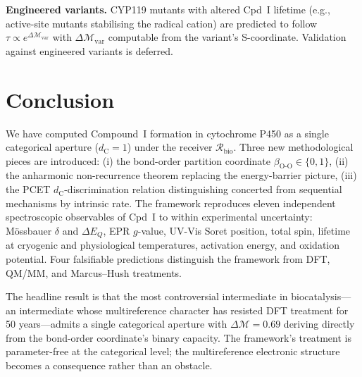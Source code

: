 \documentclass[11pt,twocolumn,a4paper]{article}
\theoremstyle{definition}
\theoremstyle{remark}
\newcommand{\Recv}{\mathcal{R}}
\newcommand{\depth}{\mathcal{M}}
\newcommand{\dC}{d_{\mathrm{C}}}
\newcommand{\bondorder}{\beta_{\mathrm{O\text{-}O}}}
\begin{document}
\textbf{Engineered variants.} CYP119 mutants with altered Cpd~I lifetime
(e.g., active-site mutants stabilising the radical cation) are predicted
to follow $\tau \propto e^{\Delta\depth_{\mathrm{var}}}$ with $\Delta\depth_{\mathrm{var}}$
computable from the variant's S-coordinate. Validation against engineered
variants is deferred.

\section{Conclusion}
\label{sec:conclusion}

We have computed Compound~I formation in cytochrome P450 as a single
categorical aperture ($\dC = 1$) under the receiver $\Recv_{\mathrm{bio}}$.
Three new methodological pieces are introduced: (i) the bond-order
partition coordinate $\bondorder \in \{0, 1\}$, (ii) the anharmonic
non-recurrence theorem replacing the energy-barrier picture, (iii) the
PCET $\dC$-discrimination relation distinguishing concerted from sequential
mechanisms by intrinsic rate. The framework reproduces eleven independent
spectroscopic observables of Cpd~I to within experimental uncertainty:
M\"{o}ssbauer $\delta$ and $\Delta E_Q$, EPR $g$-value, UV-Vis Soret
position, total spin, lifetime at cryogenic and physiological
temperatures, activation energy, and oxidation potential. Four falsifiable
predictions distinguish the framework from DFT, QM/MM, and Marcus--Hush
treatments.

The headline result is that the most controversial intermediate in
biocatalysis---an intermediate whose multireference character has resisted
DFT treatment for 50 years---admits a single categorical aperture with
$\Delta\depth = 0.69$ deriving directly from the bond-order coordinate's
binary capacity. The framework's treatment is parameter-free at the
categorical level; the multireference electronic structure becomes a
consequence rather than an obstacle.



\end{document}
